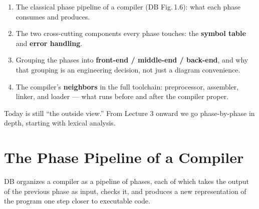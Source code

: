 \documentclass[11pt]{article}
\begin{document}
\makelecturetitle

\begin{coreidea}
\begin{enumerate}
  \item The classical phase pipeline of a compiler (DB Fig.\,1.6): what each phase consumes and
  produces.
  \item The two cross-cutting components every phase touches: the \textbf{symbol table} and
  \textbf{error handling}.
  \item Grouping the phases into \textbf{front-end / middle-end / back-end}, and why that
  grouping is an engineering decision, not just a diagram convenience.
  \item The compiler's \textbf{neighbors} in the full toolchain: preprocessor, assembler,
  linker, and loader --- what runs before and after the compiler proper.
\end{enumerate}
Today is still ``the outside view.'' From Lecture 3 onward we go phase-by-phase in depth,
starting with lexical analysis.
\end{coreidea}

\section{The Phase Pipeline of a Compiler}

\dbtag DB organizes a compiler as a pipeline of phases, each of which takes the output of the
previous phase as input, checks it, and produces a new representation of the program one step
closer to executable code.

\begin{center}
\end{center}
\end{document}
